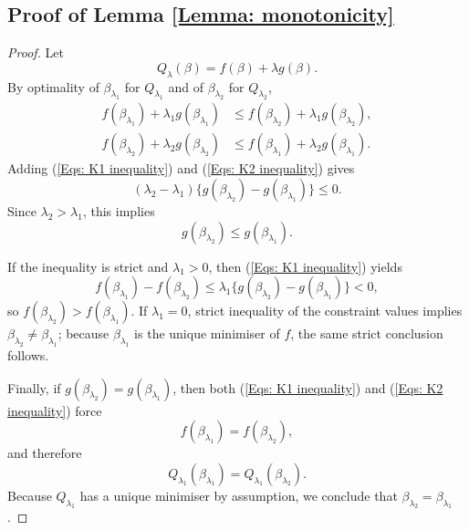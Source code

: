 \documentclass[12pt]{article}
\theoremstyle{remark}
\theoremstyle{plain}
\begin{document}
\subsection{Proof of Lemma \ref{Lemma: monotonicity}}
\begin{proof}
Let
\[
Q_\lambda(\beta)=f(\beta)+\lambda g(\beta).
\]
By optimality of $\beta_{\lambda_1}$ for $Q_{\lambda_1}$ and of $\beta_{\lambda_2}$ for $Q_{\lambda_2}$,
\begin{align}
f(\beta_{\lambda_1})+\lambda_1 g(\beta_{\lambda_1}) &\le f(\beta_{\lambda_2})+\lambda_1 g(\beta_{\lambda_2}), \label{Eqs: K1 inequality}\\
f(\beta_{\lambda_2})+\lambda_2 g(\beta_{\lambda_2}) &\le f(\beta_{\lambda_1})+\lambda_2 g(\beta_{\lambda_1}). \label{Eqs: K2 inequality}
\end{align}
Adding (\ref{Eqs: K1 inequality}) and (\ref{Eqs: K2 inequality}) gives
\[
(\lambda_2-\lambda_1)\{g(\beta_{\lambda_2})-g(\beta_{\lambda_1})\}\le 0.
\]
Since $\lambda_2>\lambda_1$, this implies
\[
g(\beta_{\lambda_2})\le g(\beta_{\lambda_1}).
\]

If the inequality is strict and $\lambda_1>0$, then (\ref{Eqs: K1 inequality}) yields
\[
f(\beta_{\lambda_1})-f(\beta_{\lambda_2})\le \lambda_1\{g(\beta_{\lambda_2})-g(\beta_{\lambda_1})\}<0,
\]
so $f(\beta_{\lambda_2})>f(\beta_{\lambda_1})$. If $\lambda_1=0$, strict inequality of the constraint values implies $\beta_{\lambda_2}\ne\beta_{\lambda_1}$; because $\beta_{\lambda_1}$ is the unique minimiser of $f$, the same strict conclusion follows.

Finally, if $g(\beta_{\lambda_2})=g(\beta_{\lambda_1})$, then both (\ref{Eqs: K1 inequality}) and (\ref{Eqs: K2 inequality}) force
\[
f(\beta_{\lambda_1})=f(\beta_{\lambda_2}),
\]
and therefore
\[
Q_{\lambda_1}(\beta_{\lambda_1})=Q_{\lambda_1}(\beta_{\lambda_2}).
\]
Because $Q_{\lambda_1}$ has a unique minimiser by assumption, we conclude that $\beta_{\lambda_2}=\beta_{\lambda_1}$.
\end{proof}
\end{document}
